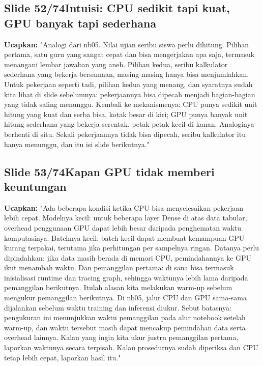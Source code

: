 \documentclass[11pt]{article}
\renewcommand{\framebox}[1]{\colorbox{acc!15}{\textcolor{acc}{\textbf{#1}}}}
\begin{document}
\subsection*{\framebox{Slide 52/74}\quad Intuisi: CPU sedikit tapi kuat, GPU banyak tapi sederhana}
\textbf{Ucapkan:} "Analogi dari nb05. Nilai ujian seribu siswa perlu dihitung. Pilihan pertama, satu guru yang sangat cepat dan bisa mengerjakan apa saja, termasuk menangani lembar jawaban yang aneh. Pilihan kedua, seribu kalkulator sederhana yang bekerja bersamaan, masing-masing hanya bisa menjumlahkan. Untuk pekerjaan seperti tadi, pilihan kedua yang menang, dan syaratnya sudah kita lihat di slide sebelumnya: pekerjaannya bisa dipecah menjadi bagian-bagian yang tidak saling menunggu. Kembali ke mekanismenya: CPU punya sedikit unit hitung yang kuat dan serba bisa, kotak besar di kiri; GPU punya banyak unit hitung sederhana yang bekerja serentak, petak-petak kecil di kanan. Analoginya berhenti di situ. Sekali pekerjaannya tidak bisa dipecah, seribu kalkulator itu hanya menunggu, dan itu isi slide berikutnya."\\[2pt]

\subsection*{\framebox{Slide 53/74}\quad Kapan GPU tidak memberi keuntungan}
\textbf{Ucapkan:} "Ada beberapa kondisi ketika CPU bisa menyelesaikan pekerjaan lebih cepat. Modelnya kecil: untuk beberapa layer Dense di atas data tabular, overhead penggunaan GPU dapat lebih besar daripada penghematan waktu komputasinya. Batchnya kecil: batch kecil dapat membuat kemampuan GPU kurang terpakai, terutama jika perhitungan per sampelnya ringan. Datanya perlu dipindahkan: jika data masih berada di memori CPU, pemindahannya ke GPU ikut menambah waktu. Dan pemanggilan pertama: di sana bisa termasuk inisialisasi runtime dan tracing graph, sehingga waktunya lebih lama daripada pemanggilan berikutnya. Itulah alasan kita melakukan warm-up sebelum mengukur pemanggilan berikutnya. Di nb05, jalur CPU dan GPU sama-sama dijalankan sebelum waktu training dan inferensi diukur. Sebut batasnya: pengukuran ini menunjukkan waktu pemanggilan pada alur notebook setelah warm-up, dan waktu tersebut masih dapat mencakup pemindahan data serta overhead lainnya. Kalau yang ingin kita ukur justru pemanggilan pertama, laporkan waktunya secara terpisah. Kalau prosedurnya sudah diperiksa dan CPU tetap lebih cepat, laporkan hasil itu."\\[2pt]
\end{document}
